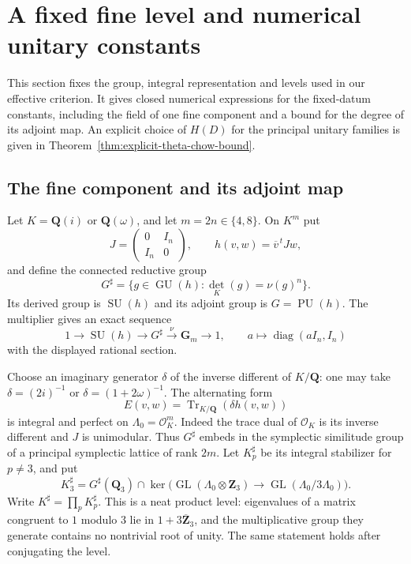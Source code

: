 \documentclass[11pt]{article}
\theoremstyle{definition}
\theoremstyle{remark}
\begin{document}
\section{A fixed fine level and numerical unitary constants}
\label{sec:ea-numerical-unitary}

This section fixes the group, integral representation and levels used in
our effective criterion.  It gives closed numerical expressions for the
fixed-datum constants, including the field of one fine component and a
bound for the degree of its adjoint map.
An explicit choice of $H(D)$ for the principal unitary families
is given in Theorem~\ref{thm:explicit-theta-chow-bound}.

\subsection{The fine component and its adjoint map}

Let $K=\mathbf Q(i)$ or $\mathbf Q(\omega)$, and let
$m=2n\in\{4,8\}$.  On $K^m$ put
\[
 J=\begin{pmatrix}0&I_n\\I_n&0\end{pmatrix},\qquad
 h(v,w)=\overline v^{\,t}Jw,
\]
and define the connected reductive group
\[
 G^\sharp=\{g\in\operatorname{GU}(h):
                   \det_K(g)=\nu(g)^n\}.
\]
Its derived group is $\operatorname{SU}(h)$ and its adjoint group is
$G=\operatorname{PU}(h)$.  The multiplier gives an exact sequence
\begin{equation}\label{eq:ea-sharp-exact}
 1\longrightarrow\operatorname{SU}(h)\longrightarrow G^\sharp
 \xrightarrow{\nu}\mathbf G_m\longrightarrow1,
 \qquad
 a\longmapsto\operatorname{diag}(aI_n,I_n)
\end{equation}
with the displayed rational section.

Choose an imaginary generator $\delta$ of the inverse different of
$K/\mathbf Q$: one may take $\delta=(2i)^{-1}$ or
$\delta=(1+2\omega)^{-1}$.  The alternating form
\[
             E(v,w)=\operatorname{Tr}_{K/\mathbf Q}(\delta h(v,w))
\]
is integral and perfect on $\Lambda_0=\mathcal O_K^m$.  Indeed the
trace dual of $\mathcal O_K$ is its inverse different and $J$ is
unimodular.  Thus $G^\sharp$ embeds in the symplectic similitude group
of a principal symplectic lattice of rank $2m$.
Let $K^\sharp_p$ be its integral stabilizer for $p\ne3$, and put
\[
 K^\sharp_3=G^\sharp(\mathbf Q_3)\cap
       \ker\bigl(\operatorname{GL}(\Lambda_0\otimes\mathbf Z_3)
             \longrightarrow\operatorname{GL}(\Lambda_0/3\Lambda_0)\bigr).
\]
Write $K^\sharp=\prod_pK^\sharp_p$.  This is a neat product level:
eigenvalues of a matrix congruent to $1$ modulo $3$ lie in
$1+3\overline{\mathbf Z}_3$, and the multiplicative group they generate
contains no nontrivial root of unity.  The same statement holds after
conjugating the level.
\end{document}
